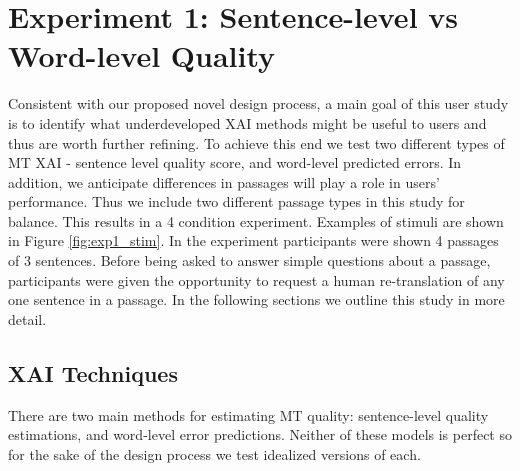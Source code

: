 \section{Experiment 1: Sentence-level vs Word-level Quality}

Consistent with our proposed novel design process, a main goal of this user study is to identify what underdeveloped XAI methods might be useful to users and thus are worth further refining. To achieve this end we test two different types of MT XAI - sentence level quality score, and word-level predicted errors. In addition, we anticipate differences in passages will play a role in users’ performance. Thus we include two different passage types in this study for balance. This results in a 4 condition experiment. Examples of stimuli are shown in Figure \ref{fig:exp1_stim}. In the experiment participants were shown 4 passages of 3 sentences. Before being asked to answer simple questions about a passage, participants were given the opportunity to request a human re-translation of any one sentence in a passage. In the following sections we outline this study in more detail. 

\subsection{XAI Techniques} 

 There are two main methods for estimating MT quality:  sentence-level quality estimations, and word-level error predictions. 
Neither of these models is perfect so for the sake of the design process we test idealized versions of each. 

